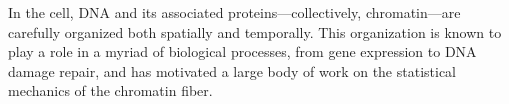 \documentclass[%
 reprint,
superscriptaddress,
showpacs,preprintnumbers,
 amsmath,amssymb,
 aps,
 prl,
]{revtex4-1}
\begin{document}


In the cell, DNA and its associated proteins---collectively, chromatin---are
    carefully organized both spatially and temporally.
This organization is known to play a role in a myriad of biological processes,
    from gene expression to DNA damage repair, and has motivated a large body of work on the statistical mechanics of
    the chromatin fiber.
\end{document}

